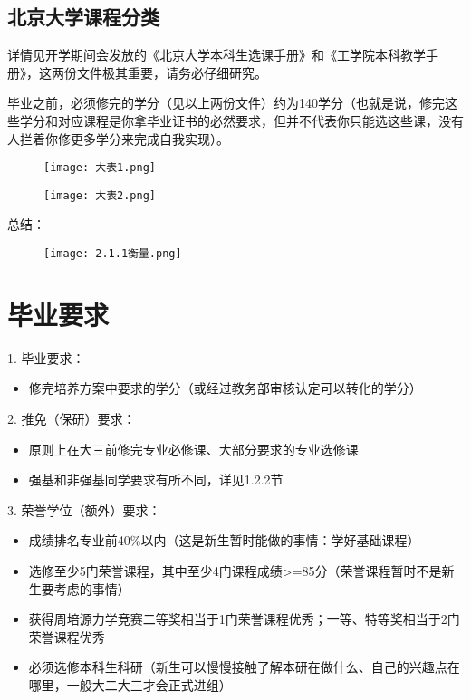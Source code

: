 \documentclass[11pt,oneside]{book}
\begin{document}
\subsection{北京大学课程分类}
详情见开学期间会发放的《北京大学本科生选课手册》和《工学院本科教学手册》，这两份文件极其重要，请务必仔细研究。

毕业之前，必须修完的学分（见以上两份文件）约为140学分（也就是说，修完这些学分和对应课程是你拿毕业证书的必然要求，但并不代表你只能选这些课，没有人拦着你修更多学分来完成自我实现）。

\begin{figure}[htbp]
    \centering
    \texttt{[image: 大表1.png]}
\end{figure}

\begin{figure}[htbp]
    \centering
    \texttt{[image: 大表2.png]}
\end{figure}



总结：
\begin{figure}[htbp]
    \centering
    \texttt{[image: 2.1.1衡量.png]}
\end{figure}

\section{毕业要求}
1. 毕业要求：

\begin{itemize}
    \item 修完培养方案中要求的学分（或经过教务部审核认定可以转化的学分）
\end{itemize}

2. 推免（保研）要求：

\begin{itemize}
    \item 原则上在大三前修完专业必修课、大部分要求的专业选修课
    \item 强基和非强基同学要求有所不同，详见1.2.2节
\end{itemize}

3. 荣誉学位（额外）要求：

\begin{itemize}
    \item 成绩排名专业前40\%以内（这是新生暂时能做的事情：学好基础课程）
    \item 选修至少5门荣誉课程，其中至少4门课程成绩>=85分（荣誉课程暂时不是新生要考虑的事情）
    \item 获得周培源力学竞赛二等奖相当于1门荣誉课程优秀；一等、特等奖相当于2门荣誉课程优秀
    \item 必须选修本科生科研（新生可以慢慢接触了解本研在做什么、自己的兴趣点在哪里，一般大二大三才会正式进组）
\end{itemize}
\end{document}

